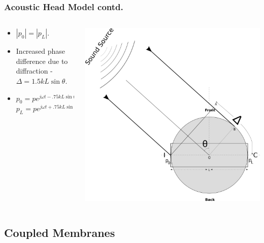 \documentclass{beamer}
\begin{document}
\begin{frame}[t]
 \frametitle{Acoustic Head Model contd.}
 \begin{columns}
     \begin{column}{.5\textwidth}
    \small
    \flushleft
     \begin{itemize}
      \item $|p_0|=|p_L|$.
      \item Increased  phase difference due to diffraction - $\Delta=1.5kL\sin\theta$.
      \item $p_0=pe^{j\omega t -.75kL\sin\theta}$\\ $p_L=pe^{j\omega t +.75kL\sin\theta}$
      \end{itemize}

    \end{column}
    
 \begin{column}{0.5\textwidth}
    \includegraphics[width = 6 cm]{Diagrams/Presentation/acousticheadmodel2.png}\\
    \end{column}

    \end{columns}
\end{frame}

\subsection{Coupled Membranes}
\end{document}
